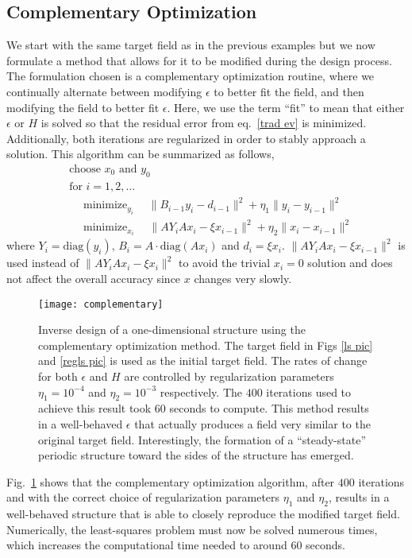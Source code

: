 \documentclass[10pt,letterpaper]{article}
\DeclareMathOperator*{\minimize}{minimize}
\begin{document}
\subsection{Complementary Optimization}\label{sec:comp}
We start with the same target field as in the previous examples but we now formulate a method that allows for it to be modified during the design process. The formulation chosen is a complementary optimization routine, where we continually alternate between modifying $\epsilon$ to better fit the field, and then modifying the field to better fit $\epsilon$. Here, we use the term ``fit'' to mean that either $\epsilon$ or $H$ is solved so that the residual error from eq.~\eqref{trad ev} is minimized. Additionally, both iterations are regularized in order to stably approach a solution. This algorithm can be summarized as follows, 
\begin{align}
&\text{choose $x_0$ and $y_0$} \nonumber \\
&\text{for } i = 1, 2, \ldots \nonumber \\
&\quad\minimize_{y_i}\quad \|B_{i-1} y_i-d_{i-1}\|^2 + \eta_1\|y_i-y_{i-1}\|^2 \label{comp1}\\
&\quad\minimize_{x_i}\quad \|A Y_i A x_i - \xi x_{i-1}\|^2 + \eta_2\|x_i-x_{i-1}\|^2 \label{comp2}
\end{align}
where $Y_i = \text{diag}(y_i)$, $B_i = A \cdot \text{diag}(A x_i)$ and $d_i = \xi x_i$. $\|A Y_i A x_i - \xi x_{i-1}\|^2$ is used instead of $\|A Y_i A x_i - \xi x_{i}\|^2$ to avoid the trivial $x_i = 0$ solution and does not affect the overall accuracy since $x$ changes very slowly. 

\begin{figure}[htbp]\centering
\texttt{[image: complementary]}
\caption{Inverse design of a one-dimensional structure using the complementary optimization method. The target field in Figs \ref{ls pic} and \ref{regls pic} is used as the initial target field. The rates of change for both $\epsilon$ and $H$ are controlled by regularization parameters $\eta_1=10^{-4}$ and $\eta_2=10^{-3}$ respectively. The $400$ iterations used to achieve this result took $60$ seconds to compute. This method results in a well-behaved $\epsilon$ that actually produces a field very similar to the original target field. Interestingly, the formation of a ``steady-state'' periodic structure toward the sides of the structure has emerged.}
\label{comp pic}
\end{figure}

Fig.~\ref{comp pic} shows that the complementary optimization algorithm, after $400$ iterations and with the correct choice of regularization parameters $\eta_1$ and $\eta_2$, results in a well-behaved structure that is able to closely reproduce the modified target field. Numerically, the least-squares problem must now be solved numerous times, which increases the computational time needed to around $60$ seconds. 
\end{document}
